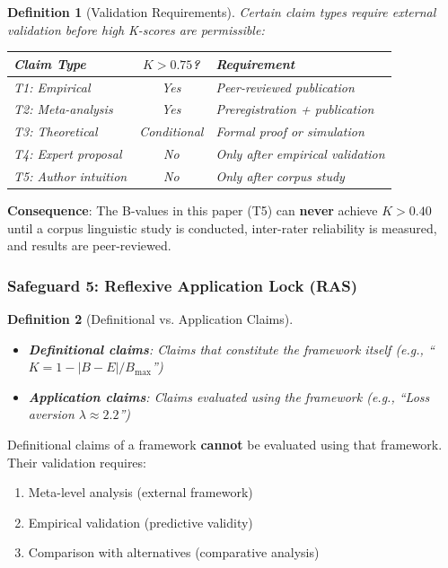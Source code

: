 \documentclass[11pt,a4paper]{article}
\newtheorem{definition}{Definition}[section]
\begin{document}
\begin{definition}[Validation Requirements]
\label{def:eva}
Certain claim types require external validation before high K-scores are permissible:

\begin{center}
\begin{tabular}{lcp{5.5cm}}
\toprule
\textbf{Claim Type} & \textbf{$K > 0.75$?} & \textbf{Requirement} \\
\midrule
T1: Empirical & Yes & Peer-reviewed publication \\
T2: Meta-analysis & Yes & Preregistration + publication \\
T3: Theoretical & Conditional & Formal proof or simulation \\
T4: Expert proposal & No & Only after empirical validation \\
T5: Author intuition & No & Only after corpus study \\
\bottomrule
\end{tabular}
\end{center}
\end{definition}

\textbf{Consequence}: The B-values in this paper (T5) can \textbf{never} achieve $K > 0.40$ until a corpus linguistic study is conducted, inter-rater reliability is measured, and results are peer-reviewed.

\subsubsection{Safeguard 5: Reflexive Application Lock (RAS)}

\begin{definition}[Definitional vs. Application Claims]
\label{def:ras}
\begin{itemize}
    \item \textbf{Definitional claims}: Claims that constitute the framework itself (e.g., ``$K = 1 - |B-E|/B_{\max}$'')
    \item \textbf{Application claims}: Claims evaluated using the framework (e.g., ``Loss aversion $\lambda \approx 2.2$'')
\end{itemize}
\end{definition}

\begin{rule}
Definitional claims of a framework \textbf{cannot} be evaluated using that framework. Their validation requires:
\begin{enumerate}
    \item Meta-level analysis (external framework)
    \item Empirical validation (predictive validity)
    \item Comparison with alternatives (comparative analysis)
\end{enumerate}
\end{rule}
\end{document}
